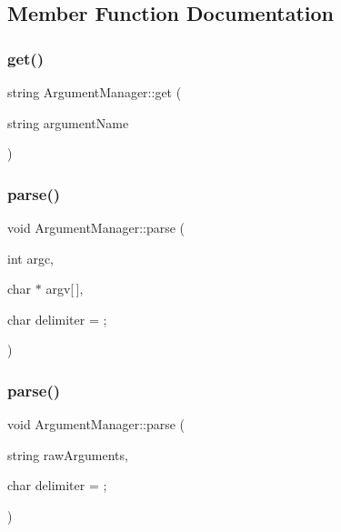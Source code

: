 \subsection{Member Function Documentation}
\mbox{\label{class_argument_manager_a0ff9fea600ee22142a49088329838aa5}} 
\subsubsection{\texorpdfstring{get()}{get()}}
{\footnotesize\ttfamily string Argument\+Manager\+::get (\begin{DoxyParamCaption}\item[{string}]{argument\+Name }\end{DoxyParamCaption})}

\mbox{\label{class_argument_manager_a7fd75ff6c3d370e5e06ebae4f2b71ba1}} 
\subsubsection{\texorpdfstring{parse()}{parse()}\hspace{0.1cm}{\footnotesize\ttfamily [1/2]}}
{\footnotesize\ttfamily void Argument\+Manager\+::parse (\begin{DoxyParamCaption}\item[{int}]{argc,  }\item[{char $\ast$}]{argv\mbox{[}$\,$\mbox{]},  }\item[{char}]{delimiter = {\ttfamily \textquotesingle{};\textquotesingle{}} }\end{DoxyParamCaption})}

\mbox{\label{class_argument_manager_a71f2f730b1f5d45fe303786054f85119}} 
\subsubsection{\texorpdfstring{parse()}{parse()}\hspace{0.1cm}{\footnotesize\ttfamily [2/2]}}
{\footnotesize\ttfamily void Argument\+Manager\+::parse (\begin{DoxyParamCaption}\item[{string}]{raw\+Arguments,  }\item[{char}]{delimiter = {\ttfamily \textquotesingle{};\textquotesingle{}} }\end{DoxyParamCaption})}

